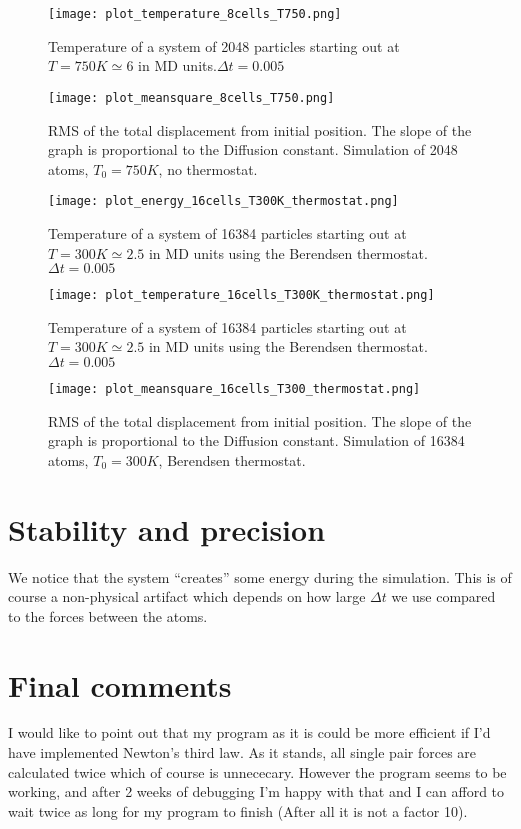\documentclass[a4paper,english, 10pt, twoside]{article}
\begin{document}
\begin{figure}[H]
\centering
\texttt{[image: plot\_temperature\_8cells\_T750.png]}
\caption{Temperature of a system of 2048 particles starting out at $T=750K \simeq 6$ in MD 
units.$\Delta t = 0.005$}
\label{distribution}
\end{figure}

\begin{figure}[H]
\centering
\texttt{[image: plot\_meansquare\_8cells\_T750.png]}
\caption{RMS of the total displacement from initial position. The slope of the graph 
is proportional to the Diffusion constant. Simulation of 2048 atoms, $T_0=750K$, no thermostat.}
\label{distribution}
\end{figure}

\begin{figure}[H]
\centering
\texttt{[image: plot\_energy\_16cells\_T300K\_thermostat.png]}
\caption{Temperature of a system of 16384 particles starting out at $T=300K \simeq 2.5$ in 
MD units using the Berendsen thermostat. $\Delta t = 0.005$}
\label{distribution}
\end{figure}

\begin{figure}[H]
\centering
\texttt{[image: plot\_temperature\_16cells\_T300K\_thermostat.png]}
\caption{Temperature of a system of 16384 particles starting out at $T=300K \simeq 2.5$ in MD units using the Berendsen thermostat. $\Delta t = 0.005$}
\label{distribution}
\end{figure}

\begin{figure}[H]
\centering
\texttt{[image: plot\_meansquare\_16cells\_T300\_thermostat.png]}
\caption{RMS of the total displacement from initial position. The slope of the graph 
is proportional to the Diffusion constant. Simulation of 16384 atoms, $T_0=300K$, Berendsen thermostat.}
\label{distribution}
\end{figure}

\section{Stability and precision}
We notice that the system ``creates'' some energy during the simulation. This is of course 
a non-physical artifact which depends on how large $\Delta t$ we use compared to the forces 
between the atoms.
\section{Final comments}
I would like to point out that my program as it is could be more efficient if I'd have 
implemented Newton's third law. As it stands, all single pair forces are calculated twice which 
of course is unnececary. However the program seems to be working, and after 2 weeks of 
debugging I'm happy with that and I can afford to wait twice as long for my program to finish 
(After all it is not a factor 10). 
% 
% 
% 
\end{document}
